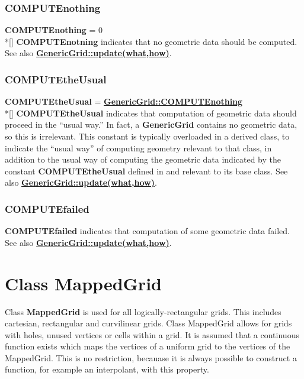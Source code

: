 \documentclass{article}
\begin{document}
  \subsubsection{COMPUTEnothing}
  \label{GenericGrid::COMPUTEnothing}
    \textbf{COMPUTEnothing} = 0 \\*[\parskip]
    \textbf{COMPUTEnotning} indicates that no geometric data should be computed.
    See also {\bf{}\hyperref{update(what,how)}{update(what,how) \rm(\S}{)}{GenericGrid::update(what,how)}}.

  \subsubsection{COMPUTEtheUsual}
  \label{GenericGrid::COMPUTEtheUsual}
    \textbf{COMPUTEtheUsual} = {\bf{}\hyperref{COMPUTEnothing}{COMPUTEnothing \rm(\S}{)}{GenericGrid::COMPUTEnothing}} \\*[\parskip]
    \textbf{COMPUTEtheUsual} indicates that computation of geometric data should proceed in the ``usual way.''
    In fact, a \textbf{GenericGrid} contains no geometric data, so this is irrelevant.
    This constant is typically overloaded in a derived class, to indicate the ``usual way''
    of computing geometry relevant to that class, in addition to the usual way of computing the
    geometric data indicated by the constant \textbf{COMPUTEtheUsual} defined in and
    relevant to its base class.
    See also {\bf{}\hyperref{update(what,how)}{update(what,how) \rm(\S}{)}{GenericGrid::update(what,how)}}.

  \subsubsection{COMPUTEfailed}
  \label{GenericGrid::COMPUTEfailed}
    \textbf{COMPUTEfailed} indicates that computation of some geometric data failed.
    See also {\bf{}\hyperref{update(what,how)}{update(what,how) \rm(\S}{)}{GenericGrid::update(what,how)}}.

\section{Class MappedGrid}
\label{MappedGrid}

Class \textbf{MappedGrid} is used for all logically-rectangular grids.
This includes cartesian, rectangular and curvilinear grids.  Class
MappedGrid allows for grids with holes, unused vertices or cells within
a grid.  It is assumed that a continuous function exists which maps the
vertices of a uniform grid to the vertices of the MappedGrid.  This
is no restriction, becauase it is always possible to construct a function,
for example an interpolant, with this property.
\end{document}
